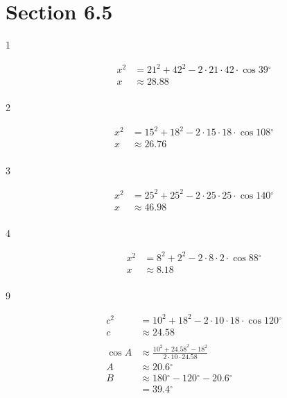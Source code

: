 \documentclass{exam}
\newcommand{\dg}{\ensuremath{^\circ}}
\begin{document}
  \ifprintanswers
    \section{Section 6.5}
    \begin{description}

      \item[1] 
        \begin{align*}
          x^2 & = 21^2 + 42^2 - 2 \cdot 21 \cdot 42 \cdot \cos 39 \dg \\
          x   & \approx \boxed{ 28.88 } \\
        \end{align*}

      \item[2] 
        \begin{align*}
          x^2 & = 15^2 + 18^2 - 2 \cdot 15 \cdot 18 \cdot \cos 108 \dg \\
          x   & \approx \boxed{ 26.76 } \\
        \end{align*}

      \item[3] 
        \begin{align*}
          x^2 & = 25^2 + 25^2 - 2 \cdot 25 \cdot 25 \cdot \cos 140 \dg \\
          x   & \approx \boxed{ 46.98 } \\
        \end{align*}

      \item[4] 
        \begin{align*}
          x^2 & = 8^2 + 2^2 - 2 \cdot 8 \cdot 2 \cdot \cos 88 \dg \\
          x   & \approx \boxed{ 8.18 } \\
        \end{align*}

      \item[9] 
        \begin{align*}
          c^2 & = 10^2 + 18^2 - 2 \cdot 10 \cdot 18 \cdot \cos 120 \dg \\
          c   & \approx \boxed{ 24.58 } \\
          \\
          \cos A & \approx \frac{ 10^2 + 24.58^2 - 18^2}{2 \cdot 10 \cdot 24.58} \\
          A      & \approx \boxed{ 20.6 \dg }
          \\
          B & \approx 180 \dg - 120 \dg - 20.6 \dg \\
            & = \boxed{ 39.4 \dg } \\
        \end{align*}


\end{description}
\end{document}
